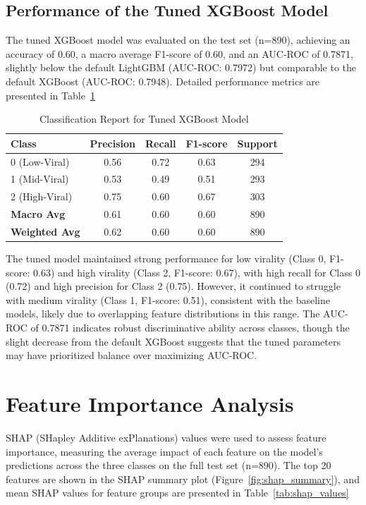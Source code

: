 \documentclass[12pt,a4paper]{report}
\begin{document}
\subsection{Performance of the Tuned XGBoost Model}
The tuned XGBoost model was evaluated on the test set (n=890), achieving an accuracy of 0.60, a macro average F1-score of 0.60, and an AUC-ROC of 0.7871, slightly below the default LightGBM (AUC-ROC: 0.7972) but comparable to the default XGBoost (AUC-ROC: 0.7948). Detailed performance metrics are presented in Table~\ref{tab:classification_report_xgboost} 

\begin{table}[h]
\centering
\caption{Classification Report for Tuned XGBoost Model}
\label{tab:classification_report_xgboost}
\begin{tabular}{lcccc}
\toprule
\textbf{Class} & \textbf{Precision} & \textbf{Recall} & \textbf{F1-score} & \textbf{Support} \\
\midrule
0 (Low-Viral)     & 0.56 & 0.72 & 0.63 & 294 \\
1 (Mid-Viral)     & 0.53 & 0.49 & 0.51 & 293 \\
2 (High-Viral)    & 0.75 & 0.60 & 0.67 & 303 \\
\midrule
\textbf{Macro Avg}    & 0.61 & 0.60 & 0.60 & 890 \\
\textbf{Weighted Avg} & 0.62 & 0.60 & 0.60 & 890 \\
\bottomrule
\end{tabular}
\end{table}

The tuned model maintained strong performance for low virality (Class 0, F1-score: 0.63) and high virality (Class 2, F1-score: 0.67), with high recall for Class 0 (0.72) and high precision for Class 2 (0.75). However, it continued to struggle with medium virality (Class 1, F1-score: 0.51), consistent with the baseline models, likely due to overlapping feature distributions in this range. The AUC-ROC of 0.7871 indicates robust discriminative ability across classes, though the slight decrease from the default XGBoost suggests that the tuned parameters may have prioritized balance over maximizing AUC-ROC.
\newpage
\section{Feature Importance Analysis}
SHAP (SHapley Additive exPlanations) values were used to assess feature importance, measuring the average impact of each feature on the model’s predictions across the three classes on the full test set (n=890). The top 20 features are shown in the SHAP summary plot (Figure~\ref{fig:shap_summary}), and mean SHAP values for feature groups are presented in Table~\ref{tab:shap_values}
\end{document}
